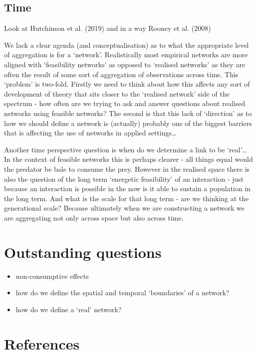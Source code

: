\documentclass[
]{article}
\begin{document}
\subsection{Time}\label{time}

Look at Hutchinson et al. (2019) and in a way Rooney et al. (2008)

We lack a clear agenda (and conceptualisation) as to what the
appropriate level of aggregation is for a `network'. Realistically most
empirical networks are more aligned with `feasibility networks' as
opposed to `realised networks' as they are often the result of some sort
of aggregation of observations across time. This `problem' is two-fold.
Firstly we need to think about how this affects any sort of development
of theory that sits closer to the `realised network' side of the
spectrum - how often are we trying to ask and answer questions about
realised networks using feasible networks? The second is that this lack
of `direction' as to how we should define a network is (actually)
probably one of the biggest barriers that is affecting the use of
networks in applied settings\ldots{}

Another time perspective question is when do we determine a link to be
`real'\ldots{} In the context of feasible networks this is perhaps
clearer - all things equal would the predator be bale to consume the
prey. However in the realised space there is also the question of the
long term `energetic feasibility' of an interaction - just because an
interaction is possible in the now is it able to sustain a population in
the long term. And what is the scale for that long term - are we
thinking at the generational scale? Because ultimately when we are
constructing a network we are aggregating not only across space but also
across time.

\section*{Outstanding questions}\label{outstanding-questions}

\begin{itemize}
\item
  non-consumptive effects
\item
  how do we define the spatial and temporal `boundaries' of a network?
\item
  how do we define a `real' network?
\end{itemize}

\section*{References}\label{references}
\end{document}
